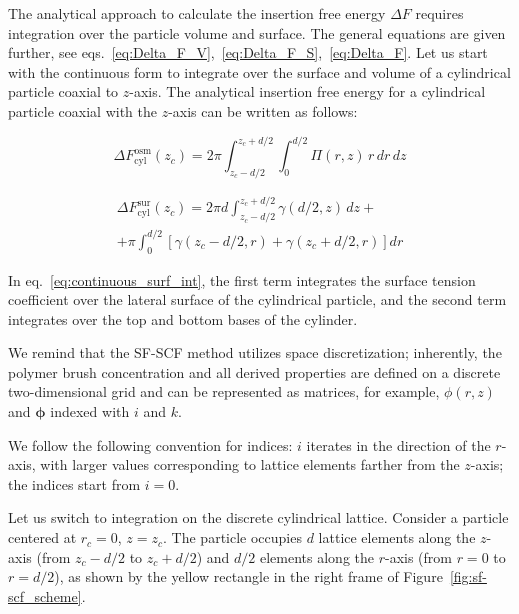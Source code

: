 \documentclass[10pt, a4paper]{article}
\begin{document}
\begin{multicols}{2}

The analytical approach to calculate the insertion free energy $\Delta F$ requires integration over the particle volume and surface.
The general equations are given further, see eqs.~\ref{eq:Delta_F_V},~\ref{eq:Delta_F_S},~\ref{eq:Delta_F}.
Let us start with the continuous form to integrate over the surface and volume of a cylindrical particle coaxial to $z$-axis.
The analytical insertion free energy for a cylindrical particle coaxial with the $z$-axis can be written as follows:

\begin{equation}
    \Delta F_{\text{cyl}}^{\text{osm}}(z_c) = 2 \pi \int_{z_c - d/2}^{z_c + d/2} \int_{0}^{d/2} \Pi(r, z) \, r \, dr \, dz
\end{equation}

\begin{equation}\label{eq:continuous_surf_int}
    \begin{aligned}
        \Delta F_{\text{cyl}}^{\text{sur}}(z_c) = 2 \pi d \int_{z_c - d/2}^{z_c + d/2} \gamma(d/2, z) \, dz +\\
        + \pi \int_{0}^{d/2} \left[ \gamma(z_c - d/2, r) + \gamma(z_c + d/2, r) \right] dr
    \end{aligned}
\end{equation}

In eq.~\ref{eq:continuous_surf_int}, the first term integrates the surface tension coefficient over the lateral surface of the cylindrical particle, and the second term integrates over the top and bottom bases of the cylinder.

We remind that the SF-SCF method utilizes space discretization; inherently, the polymer brush concentration and all derived properties are defined on a discrete two-dimensional grid and can be represented as matrices, for example, $\phi(r, z)$ and $\boldsymbol{\phi}$ indexed with $i$ and $k$.

We follow the following convention for indices: $i$ iterates in the direction of the $r$-axis, with larger values corresponding to lattice elements farther from the $z$-axis; the indices start from $i=0$.

Let us switch to integration on the discrete cylindrical lattice.
Consider a particle centered at $r_c = 0$, $z = z_c$.
The particle occupies $d$ lattice elements along the $z$-axis (from $z_c - d/2$ to $z_c + d/2$) and $d/2$ elements along the $r$-axis (from $r = 0$ to $r = d/2$), as shown by the yellow rectangle in the right frame of Figure~\ref{fig:sf-scf_scheme}.


\end{multicols}
\end{document}
